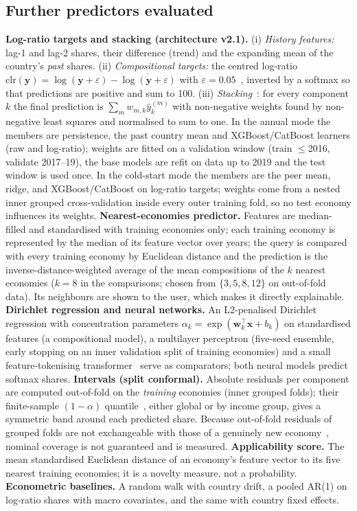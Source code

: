 \subsection{Further predictors evaluated}
\textbf{Log-ratio targets and stacking (architecture v2.1).} (i) \emph{History features:} lag-1 and lag-2 shares, their difference (trend) and the expanding mean of the country's \emph{past} shares. (ii) \emph{Compositional targets:} the centred log-ratio $\mathrm{clr}(\mathbf y)=\log(\mathbf y+\varepsilon)-\overline{\log(\mathbf y+\varepsilon)}$ with $\varepsilon=0.05$~\cite{aitchison1986,egozcue2003}, inverted by a softmax so that predictions are positive and sum to 100. (iii) \emph{Stacking}~\cite{wolpert1992}: for every component $k$ the final prediction is $\sum_m w_{m,k}\hat y^{(m)}_k$ with non-negative weights found by non-negative least squares and normalised to sum to one. In the annual mode the members are persistence, the past country mean and XGBoost/CatBoost learners (raw and log-ratio); weights are fitted on a validation window (train $\le$2016, validate 2017--19), the base models are refit on data up to 2019 and the test window is used once. In the cold-start mode the members are the peer mean, ridge, and XGBoost/CatBoost on log-ratio targets; weights come from a nested inner grouped cross-validation inside every outer training fold, so no test economy influences its weights.
\textbf{Nearest-economies predictor.} Features are median-filled and standardised with training economies only; each training economy is represented by the median of its feature vector over years; the query is compared with every training economy by Euclidean distance and the prediction is the inverse-distance-weighted average of the mean compositions of the $k$ nearest economies ($k=8$ in the comparisons; chosen from $\{3,5,8,12\}$ on out-of-fold data). Its neighbours are shown to the user, which makes it directly explainable.
\textbf{Dirichlet regression and neural networks.} An L2-penalised Dirichlet regression with concentration parameters $\alpha_k=\exp(\mathbf w_k^{\top}\mathbf x+b_k)$ on standardised features (a compositional model), a multilayer perceptron (five-seed ensemble, early stopping on an inner validation split of training economies) and a small feature-tokenising transformer~\cite{gorishniy2021} serve as comparators; both neural models predict softmax shares.
\textbf{Intervals (split conformal).} Absolute residuals per component are computed out-of-fold on the \emph{training} economies (inner grouped folds); their finite-sample $(1-\alpha)$ quantile~\cite{lei2018,angelopoulos2023}, either global or by income group, gives a symmetric band around each predicted share. Because out-of-fold residuals of grouped folds are not exchangeable with those of a genuinely new economy~\cite{barber2023}, nominal coverage is not guaranteed and is measured.
\textbf{Applicability score.} The mean standardised Euclidean distance of an economy's feature vector to its five nearest training economies; it is a novelty measure, not a probability.
\textbf{Econometric baselines.} A random walk with country drift, a pooled AR(1) on log-ratio shares with macro covariates, and the same with country fixed effects.

